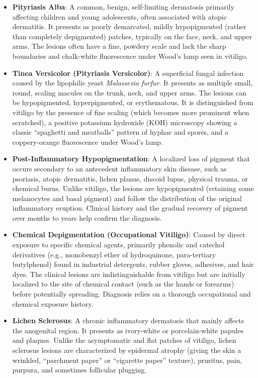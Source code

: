 \begin{itemize}
    \item \textbf{Pityriasis Alba}: A common, benign, self-limiting dermatosis primarily affecting children and young adolescents, often associated with atopic dermatitis. It presents as poorly demarcated, mildly hypopigmented (rather than completely depigmented) patches, typically on the face, neck, and upper arms. The lesions often have a fine, powdery scale and lack the sharp boundaries and chalk-white fluorescence under Wood's lamp seen in vitiligo.
    \item \textbf{Tinea Versicolor (Pityriasis Versicolor)}: A superficial fungal infection caused by the lipophilic yeast \textit{Malassezia furfur}. It presents as multiple small, round, scaling macules on the trunk, neck, and upper arms. The lesions can be hypopigmented, hyperpigmented, or erythematous. It is distinguished from vitiligo by the presence of fine scaling (which becomes more prominent when scratched), a positive potassium hydroxide (KOH) microscopy showing a classic ``spaghetti and meatballs'' pattern of hyphae and spores, and a coppery-orange fluorescence under Wood's lamp.
    \item \textbf{Post-Inflammatory Hypopigmentation}: A localized loss of pigment that occurs secondary to an antecedent inflammatory skin disease, such as psoriasis, atopic dermatitis, lichen planus, discoid lupus, physical trauma, or chemical burns. Unlike vitiligo, the lesions are hypopigmented (retaining some melanocytes and basal pigment) and follow the distribution of the original inflammatory eruption. Clinical history and the gradual recovery of pigment over months to years help confirm the diagnosis.
    \item \textbf{Chemical Depigmentation (Occupational Vitiligo)}: Caused by direct exposure to specific chemical agents, primarily phenolic and catechol derivatives (e.g., monobenzyl ether of hydroquinone, para-tertiary butylphenol) found in industrial detergents, rubber gloves, adhesives, and hair dyes. The clinical lesions are indistinguishable from vitiligo but are initially localized to the site of chemical contact (such as the hands or forearms) before potentially spreading. Diagnosis relies on a thorough occupational and chemical exposure history.
    \item \textbf{Lichen Sclerosus}: A chronic inflammatory dermatosis that mainly affects the anogenital region. It presents as ivory-white or porcelain-white papules and plaques. Unlike the asymptomatic and flat patches of vitiligo, lichen sclerosus lesions are characterized by epidermal atrophy (giving the skin a wrinkled, ``parchment paper'' or ``cigarette paper'' texture), pruritus, pain, purpura, and sometimes follicular plugging.

\end{itemize}
